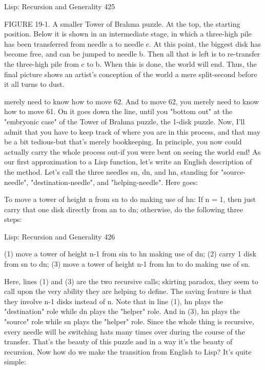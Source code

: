 Lisp: Recursion and Generality                                                        425

FIGURE 19-1. A smaller Tower of Brahma puzzle. At the top, the starting position.
Below it is shown in an intermediate stage, in which a three-high pile has been
transferred from needle a to needle c. At this point, the biggest disk has become free,
and can be jumped to needle b. Then all that is left is to re-transfer the three-high pile
from c to b. When this is done, the world will end. Thus, the final picture shows an
artist's conception of the world a mere split-second before it all turns to dust.

merely need to know how to move 62. And to move 62, you merely need to know
how to move 61. On it goes down the line, until you "bottom out" at the "embryonic
case" of the Tower of Brahma puzzle, the 1-disk puzzle. Now, I'll admit that you have
to keep track of where you are in this process, and that may be a bit tedious-but that's
merely bookkeeping. In principle, you now could actually carry the whole process
out-if you were bent on seeing the world end!
        As our first approximation to a Lisp function, let's write an English description
of the method. Let's call the three needles sn, dn, and hn, standing for "source-
needle", "destination-needle", and "helping-needle". Here goes:

To move a tower of height n from sn to do making use of hn:
     If n = 1, then just carry that one disk directly from an to dn;
     otherwise, do the following three steps:




Lisp: Recursion and Generality                                                        426

       (1) move a tower of height n-1 from sin to hn making use of dn;
       (2) carry 1 disk from sn to dn;
       (3) move a tower of height n-1 from hn to do making use of sn.

Here, lines (1) and (3) are the two recursive calls; skirting paradox, they seem to call
upon the very ability they are helping to define. The saving feature is that they involve
n-1 disks instead of n. Note that in line (1), hn plays the "destination" role while dn
plays the "helper" role. And in (3), hn plays the "source" role while sn plays the
"helper" role. Since the whole thing is recursive, every needle will be switching hats
many times over during the course of the transfer. That's the beauty of this puzzle and
in a way it's the beauty of recursion.
        Now how do we make the transition from English to Lisp? It's quite simple:

